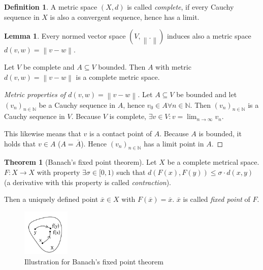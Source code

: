 \documentclass[a4paper,landscape,twocolumn]{article}
\theoremstyle{definition}
\newtheorem{theorem}{Theorem}
\newtheorem{defi}{Definition}
\newtheorem{lemma}{Lemma}
\newcommand\norm[1]{\left\|#1\right\|}
\begin{document}
\begin{defi}
  A metric space $(X, d)$ is called \emph{complete}, if every Cauchy sequence in $X$
  is also a convergent sequence, hence has a limit.
\end{defi}

\begin{lemma}
  Every normed vector space $(V, \norm{.})$ induces also a metric space
  $d(v, w) = \norm{v - w}$.

  Let $V$ be complete and $A \subseteq V$ bounded. Then $A$ with metric
  $d(v,w) = \norm{v - w}$ is a complete metric space.
\end{lemma}

\begin{proof}[Metric properties of $d(v,w) = \norm{v - w}$]
  Let $A \subseteq V$ be bounded and let $(v_n)_{n \in \mathbb N}$ be a Cauchy
  sequence in $A$, hence $v_0 \in A \forall n \in \mathbb N$.
  Then $(v_n)_{n\in\mathbb N}$ is a Cauchy sequence in $V$.
  Because $V$ is complete, $\exists v \in V: v = \lim_{n\to\infty} v_n$.

  This likewise means that $v$ is a contact point of $A$.
  Because $A$ is bounded, it holds that $v \in A$ ($A = \overline{A}$).
  Hence $(v_n)_{n\in\mathbb N}$ has a limit point in $A$.
\end{proof}

\begin{theorem}[Banach's fixed point theorem]
  Let $X$ be a complete metrical space. $F: X \to X$ with property
  $\exists \sigma \in [0,1)$ such that $d(F(x), F(y)) \leq \sigma \cdot d(x,y)$
  (a derivative with this property is called \emph{contraction}).

  Then a uniquely defined point $\overline{x} \in X$ with $F(\overline{x}) = \overline{x}$. $\overline{x}$ is called \emph{fixed point} of $F$.
  \begin{figure}[!h]
    \begin{center}
      \includegraphics[width=0.2\textwidth]{img/banachs_fpt.pdf}
      \caption{Illustration for Banach's fixed point theorem}
    \end{center}
  \end{figure}
\end{theorem}
\end{document}
